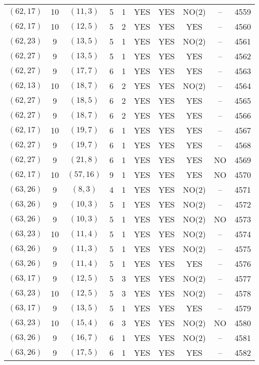 \begin{longtable}{|c|c|c|c|c|c|c|c|c|c|}
$(62, 17)$ & 10 & $(11, 3)$ & 5 & 1 & YES & YES & NO(2) & -- & 4559\\
$(62, 17)$ & 10 & $(12, 5)$ & 5 & 2 & YES & YES & YES & -- & 4560\\
$(62, 23)$ & 9 & $(13, 5)$ & 5 & 1 & YES & YES & NO(2) & -- & 4561\\
$(62, 27)$ & 9 & $(13, 5)$ & 5 & 1 & YES & YES & YES & -- & 4562\\
$(62, 27)$ & 9 & $(17, 7)$ & 6 & 1 & YES & YES & YES & -- & 4563\\
$(62, 13)$ & 10 & $(18, 7)$ & 6 & 2 & YES & YES & NO(2) & -- & 4564\\
$(62, 27)$ & 9 & $(18, 5)$ & 6 & 2 & YES & YES & YES & -- & 4565\\
$(62, 27)$ & 9 & $(18, 7)$ & 6 & 2 & YES & YES & YES & -- & 4566\\
$(62, 17)$ & 10 & $(19, 7)$ & 6 & 1 & YES & YES & YES & -- & 4567\\
$(62, 27)$ & 9 & $(19, 7)$ & 6 & 1 & YES & YES & YES & -- & 4568\\
$(62, 27)$ & 9 & $(21, 8)$ & 6 & 1 & YES & YES & YES & NO & 4569\\
$(62, 17)$ & 10 & $(57, 16)$ & 9 & 1 & YES & YES & YES & NO & 4570\\
$(63, 26)$ & 9 & $(8, 3)$ & 4 & 1 & YES & YES & NO(2) & -- & 4571\\
$(63, 26)$ & 9 & $(10, 3)$ & 5 & 1 & YES & YES & NO(2) & -- & 4572\\
$(63, 26)$ & 9 & $(10, 3)$ & 5 & 1 & YES & YES & NO(2) & NO & 4573\\
$(63, 23)$ & 10 & $(11, 4)$ & 5 & 1 & YES & YES & NO(2) & -- & 4574\\
$(63, 26)$ & 9 & $(11, 3)$ & 5 & 1 & YES & YES & NO(2) & -- & 4575\\
$(63, 26)$ & 9 & $(11, 4)$ & 5 & 1 & YES & YES & YES & -- & 4576\\
$(63, 17)$ & 9 & $(12, 5)$ & 5 & 3 & YES & YES & NO(2) & -- & 4577\\
$(63, 23)$ & 10 & $(12, 5)$ & 5 & 3 & YES & YES & NO(2) & -- & 4578\\
$(63, 17)$ & 9 & $(13, 5)$ & 5 & 1 & YES & YES & YES & -- & 4579\\
$(63, 23)$ & 10 & $(15, 4)$ & 6 & 3 & YES & YES & NO(2) & NO & 4580\\
$(63, 26)$ & 9 & $(16, 7)$ & 6 & 1 & YES & YES & NO(2) & -- & 4581\\
$(63, 26)$ & 9 & $(17, 5)$ & 6 & 1 & YES & YES & YES & -- & 4582\\

\end{longtable}
